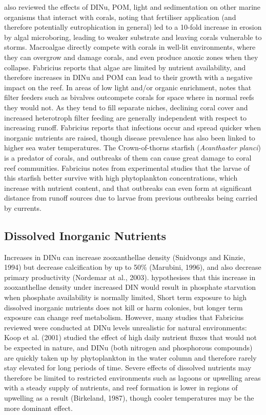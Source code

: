 \documentclass[11pt,a4paper]{article}
\begin{document}
\cite{Fabricius2005} also reviewed the effects of DINu, POM, light and sedimentation on other marine organisms that interact with corals, noting that fertiliser application (and therefore potentially eutrophication in general) led to a 10-fold increase in erosion by algal microboring, leading to weaker substrate and leaving corals vulnerable to storms.
 Macroalgae directly compete with corals in well-lit environments, where they can overgrow and damage corals, and even produce anoxic zones when they collapse. Fabricius reports that algae are limited by nutrient availability, and therefore increases in DINu and POM can lead to their growth with a negative impact on the reef.
In areas of low light and/or organic enrichment, \cite{Fabricius2005} notes that filter feeders such as bivalves outcompete corals for space where in normal reefs they would not. As they tend to fill separate niches, declining coral cover and increased heterotroph filter feeding are generally independent with respect to increasing runoff.
Fabricius reports that infections occur and spread quicker when inorganic nutrients are raised, though disease prevalence has also been linked to higher sea water temperatures.
The Crown-of-thorns starfish (\textit{Acanthaster planci}) is a predator of corals, and outbreaks of them can cause great damage to coral reef communities. Fabricius notes from experimental studies that the larvae of this starfish better survive with high phytoplankton concentrations, which increase with nutrient content, and that outbreaks can even form at significant distance from runoff sources due to larvae from previous outbreaks being carried by currents.

\subsection{Dissolved Inorganic Nutrients}

Increases in DINu can increase zooxanthellae density (Snidvongs and Kinzie, 1994) but decrease calcification by up to 50\% (Marubini, 1996), and also decrease primary productivity (Nordemar at al., 2003).
 \cite{Wiedemann2013} hypothesises that this increase in zooxanthellae density under increased DIN would result in phosphate starvation when phosphate availability is normally limited, 
 Short term exposure to high dissolved inorganic nutrients does not kill or harm colonies, but longer term exposure can change reef metabolism.
  However, many studies that Fabricius reviewed were conducted at DINu levels unrealistic for natural environments: Koop et al. (2001) studied the effect of high daily nutrient fluxes that would not be expected in nature, and DINu (both nitrogen and phosphorous compounds) are quickly taken up by phytoplankton in the water column and therefore rarely stay elevated for long periods of time.
 Severe effects of dissolved nutrients may therefore be limited to restricted environments such as lagoons or upwelling areas with a steady supply of nutrients, and reef formation is lower in regions of upwelling as a result (Birkeland, 1987), though cooler temperatures may be the more dominant effect.
\end{document}
